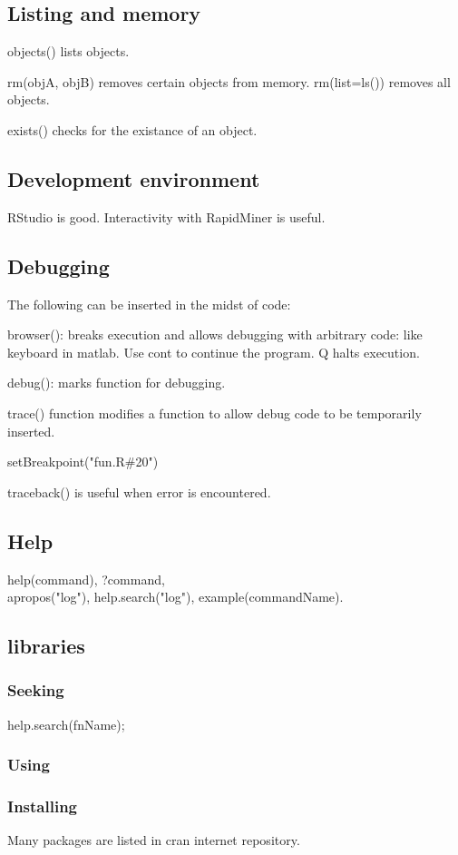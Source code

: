 \documentclass[oneside, article]{memoir}
\begin{document}
\subsection{Listing and memory}
objects() lists objects.

rm(objA, objB) removes certain objects from memory. rm(list=ls()) removes all objects.


exists() checks for the existance of an object.

\subsection{Development environment}
RStudio is good. Interactivity with RapidMiner is useful.

\subsection{Debugging}
The following can be inserted in the midst of code:

browser(): breaks execution and allows debugging with arbitrary code: like keyboard in matlab. Use cont to continue the program. Q halts execution.

debug(): marks function for debugging.

trace() function modifies a function to allow debug code to be temporarily inserted.

setBreakpoint("fun.R\#20")

traceback() is useful when error is encountered.

\subsection{Help}
help(command), ?command, \\
apropos("log"), help.search("log"), example(commandName).

\subsection{libraries}
\subsubsection{Seeking}
help.search(fnName);

\subsubsection{Using}

\subsubsection{Installing}
Many packages are listed in cran internet repository.
\end{document}
